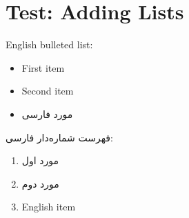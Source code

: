 \documentclass[12pt,a4paper]{article}
\newcommand{\fa}[1]{\textfarsi{#1}}
\newcommand{\en}[1]{\textenglish{#1}}
\begin{document}
\section*{Test: Adding Lists}

\en{English bulleted list:}
\begin{itemize}
\item \en{First item}
\item \en{Second item}
\item \fa{مورد فارسی}
\end{itemize}

\fa{فهرست شماره‌دار فارسی:}
\begin{enumerate}
\item \fa{مورد اول}
\item \fa{مورد دوم}
\item \en{English item}
\end{enumerate}
\end{document}
